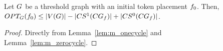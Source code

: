 \documentclass[msc,english,table,xcdraw]{ppgccufmg}
\begin{document}



\begin{lemma}
\label{lem:ub_threshold}
Let $G$ be a threshold graph with an initial token placement $f_{0}$.
Then, $OPT_{G}(f_{0}) \leq |V(G)| - 
|CS^{1}(CG_{f})| +
|CS^{0}(CG_{f})|$.
\end{lemma}
\begin{proof}
Directly from Lemma~\ref{lem:m_onecycle} and Lemma~\ref{lem:m_zerocycle}.
\end{proof}


\end{document}
